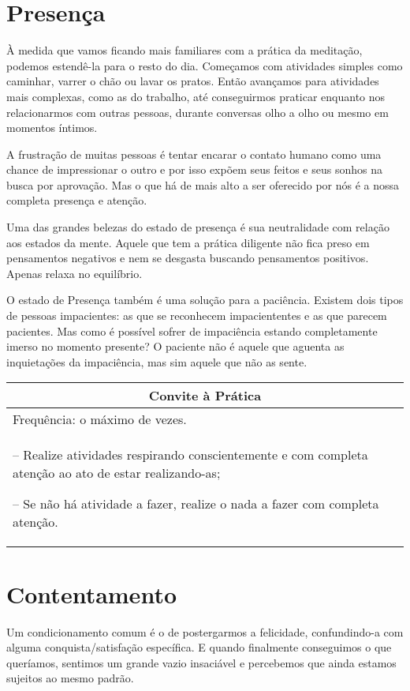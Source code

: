 \documentclass[oneside, 12pt]{book}
\newenvironment{prat}[1]
{\begin{center}
\begin{tabular}{p{0.9\textwidth}}
\hline\hline
\multicolumn{1}{c}{Convite à Prática}\\
\hline
Frequência: #1.\\
\hline
}{\\
\hline\hline
\end{tabular} 
\end{center}}
\begin{document}
\section*{Presença}

À medida que vamos ficando mais familiares com a prática da meditação, podemos estendê-la para o resto do dia. Começamos com atividades simples como caminhar, varrer o chão ou lavar os pratos. Então avançamos para atividades mais complexas, como as do trabalho, até conseguirmos praticar enquanto nos relacionarmos com outras pessoas, durante conversas olho a olho ou mesmo em momentos íntimos.

A frustração de muitas pessoas é tentar encarar o contato humano como uma chance de impressionar o outro e por isso expõem seus feitos e seus sonhos na busca por aprovação. Mas o que há de mais alto a ser oferecido por nós é a nossa completa presença e atenção.

Uma das grandes belezas do estado de presença é sua neutralidade com relação aos estados da mente. Aquele que tem a prática diligente não fica preso em pensamentos negativos e nem se desgasta buscando pensamentos positivos. Apenas relaxa no equilíbrio.

O estado de Presença também é uma solução para a paciência. Existem dois tipos de pessoas impacientes: as que se reconhecem impaciententes e as que parecem pacientes. Mas como é possível sofrer de impaciência estando completamente imerso no momento presente? O paciente não é aquele que aguenta as inquietações da impaciência, mas sim aquele que não as sente.

\begin{prat}{o máximo de vezes}
-- Realize atividades respirando conscientemente e com completa a\-ten\-ção ao ato de estar realizando-as;

-- Se não há atividade a fazer, realize o nada a fazer com completa atenção.
\end{prat}

\section*{Contentamento}

Um condicionamento comum é o de postergarmos a felicidade, con\-fun\-din\-do\--a com alguma conquista/satisfação específica. E quando finalmente conseguimos o que queríamos, sentimos um grande vazio insaciável e percebemos que ainda estamos sujeitos ao mesmo padrão.
\end{document}
